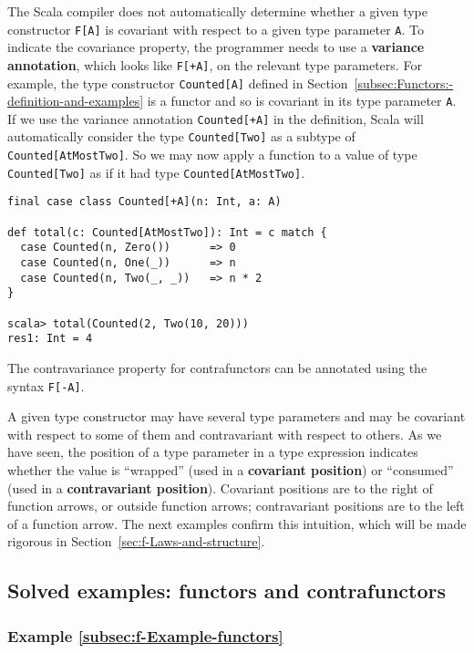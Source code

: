 The Scala compiler does not automatically determine whether a given
type constructor \lstinline!F[A]! is covariant with respect to a
given type parameter \lstinline!A!. To indicate the covariance property,
the programmer needs to use a \textbf{variance
annotation}, which looks like \lstinline!F[+A]!, on the relevant
type parameters. For example, the type constructor \lstinline!Counted[A]!
defined in Section~\ref{subsec:Functors:-definition-and-examples}
is a functor and so is covariant in its type parameter \lstinline!A!.
If we use the variance annotation \lstinline!Counted[+A]! in the
definition, Scala will automatically consider the type \lstinline!Counted[Two]!
as a subtype of \lstinline!Counted[AtMostTwo]!. So we may now apply
a function to a value of type \lstinline!Counted[Two]! as if it had
type \lstinline!Counted[AtMostTwo]!.
\begin{lstlisting}
final case class Counted[+A](n: Int, a: A)

def total(c: Counted[AtMostTwo]): Int = c match {
  case Counted(n, Zero())      => 0
  case Counted(n, One(_))      => n
  case Counted(n, Two(_, _))   => n * 2
}

scala> total(Counted(2, Two(10, 20)))
res1: Int = 4
\end{lstlisting}

The contravariance property for contrafunctors can be annotated using
the syntax \lstinline!F[-A]!.

A given type constructor may have several type parameters and may
be covariant with respect to some of them and contravariant with respect
to others. As we have seen, the position of a type parameter in a
type expression indicates whether the value is ``wrapped'' (used
in a \textbf{covariant position}) or ``consumed''
(used in a \textbf{contravariant position}).
Covariant positions are to the right of function arrows, or outside
function arrows; contravariant positions are to the left of a function
arrow. The next examples confirm this intuition, which will be made
rigorous in Section~\ref{sec:f-Laws-and-structure}.

\subsection{Solved examples: functors and contrafunctors}

\subsubsection{Example \label{subsec:f-Example-functors}\ref{subsec:f-Example-functors}}

